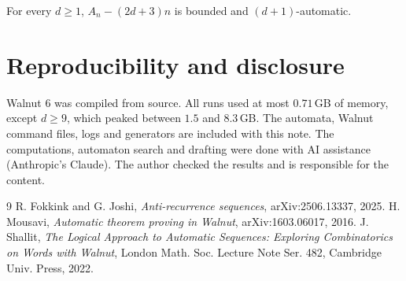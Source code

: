 \documentclass[11pt]{article}
\theoremstyle{remark}\newtheorem{remark}[theorem]{Remark}
\begin{document}
\begin{conjecture}
For every \(d\ge1\), \(A_n-(2d+3)n\) is bounded and \((d+1)\)-automatic.
\end{conjecture}

\section{Reproducibility and disclosure}
Walnut 6 was compiled from source. All runs used at most \(0.71\)\,GB of memory, except \(d\ge9\), which peaked between \(1.5\) and \(8.3\)\,GB. The automata, Walnut command files, logs and generators are included with this note. The computations, automaton search and drafting were done with AI assistance (Anthropic's Claude). The author checked the results and is responsible for the content.

\begin{thebibliography}{9}
 R. Fokkink and G. Joshi, \emph{Anti-recurrence sequences}, arXiv:2506.13337, 2025.
 H. Mousavi, \emph{Automatic theorem proving in Walnut}, arXiv:1603.06017, 2016.
 J. Shallit, \emph{The Logical Approach to Automatic Sequences: Exploring Combinatorics on Words with Walnut}, London Math. Soc. Lecture Note Ser. 482, Cambridge Univ. Press, 2022.
\end{thebibliography}
\end{document}
